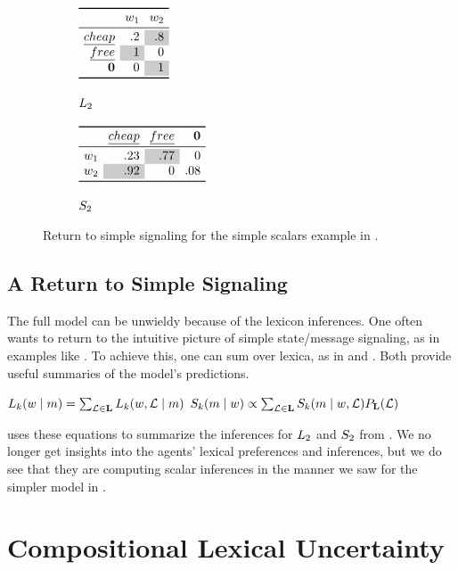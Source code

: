 \documentclass[12pt,twoside]{article}
\renewcommand{\_}{\textbf{\textunderscore\hspace{-4pt}\textunderscore\hspace{-3pt}\textunderscore\hspace{-4pt}\textunderscore}\hspace{0.5pt}}			%
\begin{document}
\begin{figure}[tp]
  \centering
  \renewcommand{\arraystretch}{0.85}
  \begin{subfigure}[b]{0.4\textwidth}
    \centering
    $\examplelistener{.2 & \graycell{.8}}{\graycell{1} & 0}{0 & \graycell{1}}$
    \caption{$\ListenerK[2]$}
  \end{subfigure}
  \qquad
  \begin{subfigure}[b]{0.4\textwidth}
    \centering
    $\examplespeaker{.23 & \graycell{.77} & 0}{\graycell{.92} & 0 & .08}$
    \caption{$\SpeakerK[2]$}
  \end{subfigure}
  \caption{Return to simple signaling for the simple scalars example
    in .}
  \label{fig:marginalized}
\end{figure}


\subsection{A Return to Simple Signaling}\label{sec:return}

The full model can be unwieldy because of the lexicon inferences.  One
often wants to return to the intuitive picture of simple state/message
signaling, as in examples like . To achieve this,
one can sum over lexica, as in  and . Both
provide useful summaries of the model's predictions.
%
\begin{exe}
\ex\label{lisnorm} $\ListenerK(\state \given \msg)  = \sum_{\Lex \in \LexSet} \ListenerK(\state, \Lex \given \msg)$
\ex\label{spknorm} $\SpeakerK(\msg \given \state) \propto \sum_{\Lex \in \LexSet} \SpeakerK(\msg \given \state, \Lex) \LexPrior(\Lex)$
\end{exe}
%
 uses these equations to summarize the
inferences for $\ListenerK[2]$ and $\SpeakerK[2]$ from
. We no longer get insights into the
agents' lexical preferences and inferences, but we do see that they
are computing scalar inferences in the manner we saw for the simpler
model in .


\section{Compositional Lexical Uncertainty}\label{sec:composition}
\end{document}
